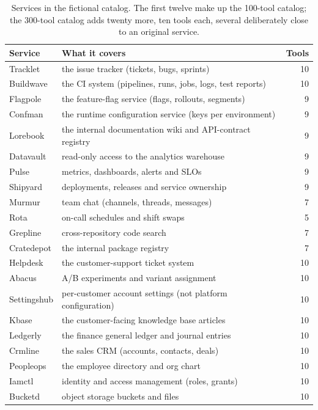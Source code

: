 \begin{table}[h]
\centering\small
\caption{Services in the fictional catalog. The first twelve make up the 100-tool catalog; the 300-tool catalog adds twenty more, ten tools each, several deliberately close to an original service.}
\label{tab:services}
\begin{tabularx}{\linewidth}{@{}l X r@{}}
\toprule Service & What it covers & Tools \\ \midrule
Tracklet & the issue tracker (tickets, bugs, sprints) & 10 \\
Buildwave & the CI system (pipelines, runs, jobs, logs, test reports) & 10 \\
Flagpole & the feature-flag service (flags, rollouts, segments) & 9 \\
Confman & the runtime configuration service (keys per environment) & 9 \\
Lorebook & the internal documentation wiki and API-contract registry & 9 \\
Datavault & read-only access to the analytics warehouse & 9 \\
Pulse & metrics, dashboards, alerts and SLOs & 9 \\
Shipyard & deployments, releases and service ownership & 9 \\
Murmur & team chat (channels, threads, messages) & 7 \\
Rota & on-call schedules and shift swaps & 5 \\
Grepline & cross-repository code search & 7 \\
Cratedepot & the internal package registry & 7 \\ \midrule
Helpdesk & the customer-support ticket system & 10 \\
Abacus & A/B experiments and variant assignment & 10 \\
Settingshub & per-customer account settings (not platform configuration) & 10 \\
Kbase & the customer-facing knowledge base articles & 10 \\
Ledgerly & the finance general ledger and journal entries & 10 \\
Crmline & the sales CRM (accounts, contacts, deals) & 10 \\
Peopleops & the employee directory and org chart & 10 \\
Iamctl & identity and access management (roles, grants) & 10 \\
Bucketd & object storage buckets and files & 10 \\

\end{tabularx}
\end{table}
